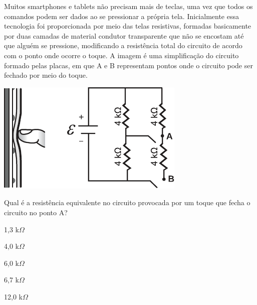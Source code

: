 \questao \label{cn-last}
Muitos smartphones e tablets não precisam mais de teclas, uma vez que todos os comandos podem ser dados ao se pressionar a própria tela. Inicialmente essa tecnologia foi proporcionada por meio das telas resistivas, formadas basicamente por duas camadas de material condutor transparente que não se encostam até que alguém se pressione, modificando a resistência total do circuito de acordo com o ponto onde ocorre o toque. A imagem é uma simplificação do circuito formado pelas placas, em que A e B representam pontos onde o circuito pode ser fechado por meio do toque.
\begin{center}
\includegraphics[width=\columnwidth]{subareas/ciencias_natureza/fisica-7.pdf}
\end{center}
Qual é a resistência equivalente no circuito provocada por um toque que fecha o circuito no ponto A?
\begin{alternativas}
\item 1,3 k$\Omega$
\item 4,0 k$\Omega$
\item 6,0 k$\Omega$
\item 6,7 k$\Omega$
\item 12,0 k$\Omega$
\end{alternativas}


